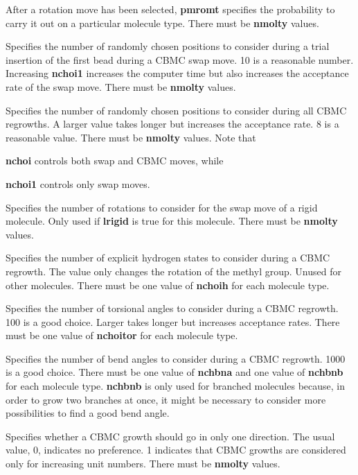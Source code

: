 \documentclass[12pt,letterpaper]{article}
\begin{document}
{{{ After a rotation move has been selected,
{\textbf{pmromt}} specifies the probability to carry it out on a particular molecule
type.  There must be {\textbf{nmolty}} values.

 Specifies the number of randomly chosen
positions to consider during a trial insertion of the first bead during a CBMC
swap move.  10 is a reasonable number.  
Increasing {\textbf{nchoi1}} increases the computer time but also increases
the acceptance rate of the swap move.
There must be {\textbf{nmolty}} values.

 Specifies the number of randomly chosen positions
to consider during all CBMC regrowths.  A larger value takes longer
but increases the acceptance rate.  8 is a reasonable value.  
There must be {\textbf{nmolty}} values.
Note that {\textbf{nchoi} controls both swap and CBMC moves, while 
{\textbf{nchoi1} controls only swap moves.

 Specifies the number of rotations to consider
for the swap move of a rigid molecule.  
Only used if {\textbf{lrigid}} is true for this molecule.  
There must be {\textbf{nmolty}} values.

 Specifies the number of explicit hydrogen states
to consider during a CBMC regrowth.  The value only changes the rotation of the 
methyl group.  Unused for other molecules. There must be one value
of {\textbf {nchoih}} for each molecule type.

 Specifies the number of torsional angles to
consider during a CBMC regrowth.  100 is a good choice.  Larger takes
longer but increases acceptance rates.  There must be one value of
{\textbf {nchoitor}} for each molecule type.

 Specifies the number of bend angles to
consider during a CBMC regrowth.  1000 is a good choice.  
There must be one value of {\textbf {nchbna}} and one value of {\textbf{nchbnb}} 
for each molecule type.
{\textbf {nchbnb}} is only used for branched molecules because, in order to grow two branches 
at once, it might be necessary to consider more possibilities to find a good bend angle.

 Specifies whether a CBMC growth should go
in only one direction.  The usual value, 0, indicates no preference.
1 indicates that CBMC growths are considered only for increasing unit numbers.
There must be {\textbf{nmolty}} values.

}}}}}
\end{document}

